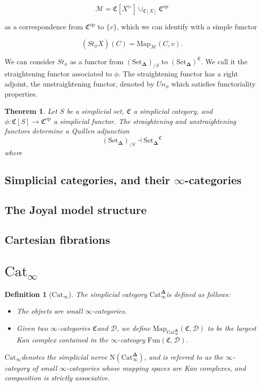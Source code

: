 \documentclass[12pt]{amsart}
\newcommand{\8}{\ensuremath{\infty}}
\newcommand{\C}{\ensuremath{\mathfrak{C}}}
\newcommand{\D}{\ensuremath{\mathscr{D}}}
\newcommand{\SSet}{\ensuremath{\text{Set}_{\boldsymbol{\Delta}}}}
\newcommand{\Catinfdel}{\ensuremath{\text{Cat}^{\boldsymbol{\Delta}}_{\infty}}}
\newcommand{\Catinf}{\ensuremath{\text{Cat}_{\infty}}}
\newcommand{\op}[1]{\ensuremath{{#1}^{\text{op}}}}
\newcommand{\Map}{\ensuremath{\text{Map}}}
\newcommand{\Fun}{\ensuremath{\text{Fun}}}
\newtheorem{definition}{Definition}
\newtheorem{theorem}{Theorem}
\begin{document}
$$
  \mathcal{M} = \mathfrak{C}[X^{\triangleright}]\displaystyle \cup_{\mathfrak{C}[X]}\op\C
$$

as a correspondence from $\op\C$ to $\{v\}$, which we can identify with a simple functor

$$
  (St_\phi X)(C)=\text{Map}_\mathcal{M}(C, v).
$$

We can consider $St_\phi$ as a functor from $(\SSet)_{/S}$ to $(\SSet)^\C$. We call it the straightening functor associated to $\phi$.
The straightening functor has a right adjoint, the unstraightening functor, denoted by $Un_\phi$ which satisfies functoriality properties.

\begin{theorem}
  Let $S$ be a simplicial set, $\C$ a simplicial category, and $\phi: \mathfrak{C}[S] \rightarrow\op\C$ a simplicial functor. The straightening and unstraightening functors determine a Quillen adjunction
  $$
    (\SSet)_{/S}\dashv \SSet^\C
  $$
  where
\end{theorem}


\subsection{Simplicial categories, and their \texorpdfstring{$\8$-categories}{∞-categories}}
\subsection{The Joyal model structure}
\subsection{Cartesian fibrations}

\section{\texorpdfstring{$\text{Cat}_\8$}{Cat∞}}

\begin{definition}[\Catinf]
  The simplicial category \Catinfdel is defined as follows:
  \begin{itemize}
    \item The objects are small \8-categories.
    \item Given two \8-categories \C and \D, we define $\Map_{\Catinfdel}(\C, \D)$ to be the largest Kan complex contained in the \8-cateogry $\Fun(\C, \D)$.
  \end{itemize}

  \Catinf denotes the simplicial nerve $\text{N}(\Catinfdel)$, and is referred to as the \8-category of small \8-categories whose mapping spaces are Kan complexes, and composition is strictly associative.
\end{definition}
\end{document}
